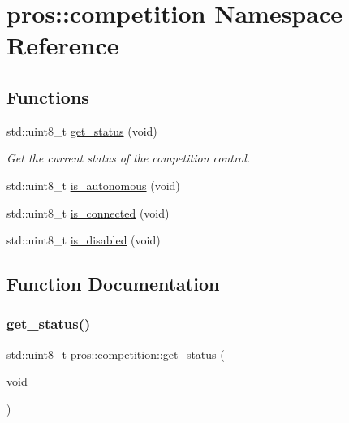 \hypertarget{namespacepros_1_1competition}{}\section{pros\+:\+:competition Namespace Reference}
\label{namespacepros_1_1competition}
\subsection*{Functions}
\begin{DoxyCompactItemize}
\item 
std\+::uint8\+\_\+t \hyperlink{namespacepros_1_1competition_ad75e0e06e0817959c08798358eaa8ab0}{get\+\_\+status} (void)
\begin{DoxyCompactList}\small\item\em Get the current status of the competition control. \end{DoxyCompactList}\item 
std\+::uint8\+\_\+t \hyperlink{namespacepros_1_1competition_a88353a4f8e5e283558ee6504c54283af}{is\+\_\+autonomous} (void)
\item 
std\+::uint8\+\_\+t \hyperlink{namespacepros_1_1competition_aaf36367a2369390657f6bc4285f68c64}{is\+\_\+connected} (void)
\item 
std\+::uint8\+\_\+t \hyperlink{namespacepros_1_1competition_a2d4f4555af4c45f7f82ea75e1223899b}{is\+\_\+disabled} (void)
\end{DoxyCompactItemize}


\subsection{Function Documentation}
\mbox{\label{namespacepros_1_1competition_ad75e0e06e0817959c08798358eaa8ab0}} 
\subsubsection{\texorpdfstring{get\+\_\+status()}{get\_status()}}
{\footnotesize\ttfamily std\+::uint8\+\_\+t pros\+::competition\+::get\+\_\+status (\begin{DoxyParamCaption}\item[{void}]{ }\end{DoxyParamCaption})}



